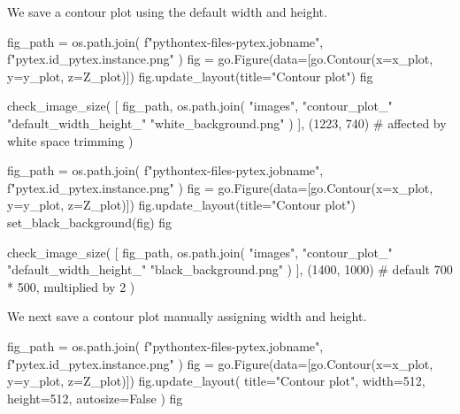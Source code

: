 \documentclass[oneside]{book}
\begin{document}
\begin{mdcell}
We save a contour plot using the default width and height.
\end{mdcell}

\begin{pycell}
fig_path = os.path.join(
    f"pythontex-files-{pytex.jobname}",
    f"{pytex.id}_{pytex.instance}.png"
)
fig = go.Figure(data=[go.Contour(x=x_plot, y=y_plot, z=Z_plot)])
fig.update_layout(title="Contour plot")
fig
\end{pycell}

\begin{pycell}
check_image_size(
    [
        fig_path,
        os.path.join(
            "images",
            "contour_plot_"
            "default_width_height_"
            "white_background.png"
        )
    ],
    (1223, 740)  # affected by white space trimming
)
\end{pycell}

\begin{pycell}
fig_path = os.path.join(
    f"pythontex-files-{pytex.jobname}",
    f"{pytex.id}_{pytex.instance}.png"
)
fig = go.Figure(data=[go.Contour(x=x_plot, y=y_plot, z=Z_plot)])
fig.update_layout(title="Contour plot")
set_black_background(fig)
fig
\end{pycell}

\begin{pycell}
check_image_size(
    [
        fig_path,
        os.path.join(
            "images",
            "contour_plot_"
            "default_width_height_"
            "black_background.png"
        )
    ],
    (1400, 1000)  # default 700 * 500, multiplied by 2
)
\end{pycell}

\begin{mdcell}
We next save a contour plot manually assigning width and height.
\end{mdcell}

\begin{pycell}
fig_path = os.path.join(
    f"pythontex-files-{pytex.jobname}",
    f"{pytex.id}_{pytex.instance}.png"
)
fig = go.Figure(data=[go.Contour(x=x_plot, y=y_plot, z=Z_plot)])
fig.update_layout(
    title="Contour plot", width=512, height=512, autosize=False
)
fig
\end{pycell}
\end{document}
